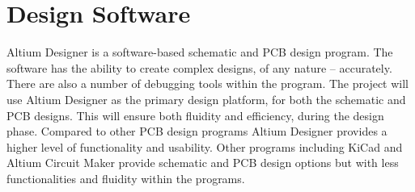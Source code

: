
\section{Design Software}

	Altium Designer is a software-based schematic and PCB design program. The software has the ability to create complex designs, of any nature – accurately. There are also a number of debugging tools within the program. 
The project will use Altium Designer as the primary design platform, for both the schematic and PCB designs. This will ensure both fluidity and efficiency, during the design phase. 
Compared to other PCB design programs Altium Designer provides a higher level of functionality and usability. Other programs including KiCad and Altium Circuit Maker provide schematic and PCB design options but with less functionalities and fluidity within the programs. 
